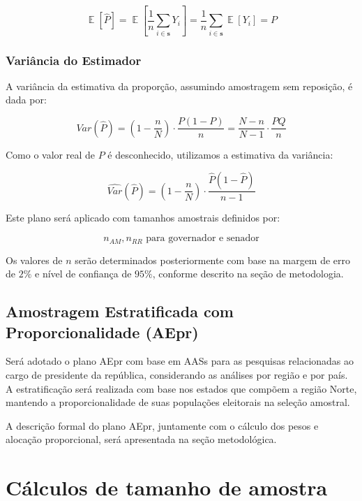 \documentclass{article}
\DeclareMathOperator{\E}{\mathbb{E}}
\begin{document}
\[
\E[\hat{P}] = \E\left[\frac{1}{n}\sum_{i \in \mathbf{s}} Y_i\right] = \frac{1}{n} \sum_{i \in \mathbf{s}} \E[Y_i] = P
\]

\subsubsection*{Variância do Estimador}

A variância da estimativa da proporção, assumindo amostragem sem reposição, é dada por:

\[
Var(\hat{P}) = \left(1 - \frac{n}{N}\right) \cdot \frac{P(1 - P)}{n} = \frac{N - n}{N - 1} \cdot \frac{PQ}{n}
\]

Como o valor real de $P$ é desconhecido, utilizamos a estimativa da variância:

\[
\widehat{Var}(\hat{P}) = \left(1 - \frac{n}{N} \right) \cdot \frac{\hat{P}(1 - \hat{P})}{n - 1}
\]

Este plano será aplicado com tamanhos amostrais definidos por:

\[
n_{AM}, n_{RR} \text{ para governador e senador}
\]

Os valores de $n$ serão determinados posteriormente com base na margem de erro de $2\%$ e nível de confiança de $95\%$, conforme descrito na seção de metodologia.

\subsection*{Amostragem Estratificada com Proporcionalidade (AEpr)}

Será adotado o plano AEpr com base em AASs para as pesquisas relacionadas ao cargo de presidente da república, considerando as análises por região e por país. A estratificação será realizada com base nos estados que compõem a região Norte, mantendo a proporcionalidade de suas populações eleitorais na seleção amostral.

A descrição formal do plano AEpr, juntamente com o cálculo dos pesos e alocação proporcional, será apresentada na seção metodológica.

\section{Cálculos de tamanho de amostra}
\end{document}
